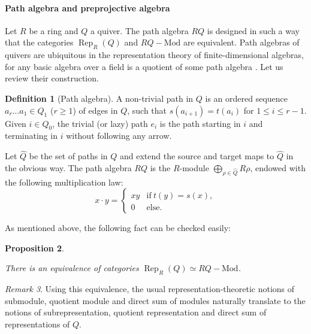 \documentclass[11pt,english]{article}
\numberwithin{equation}{section}
\numberwithin{figure}{section}
\theoremstyle{definition}
\newtheorem{df}{Definition}[subsection]
\theoremstyle{plain}
\newtheorem{prop}[df]{Proposition}
\theoremstyle{remark}
\newtheorem{rmk}[df]{Remark}
\DeclareMathOperator{\Rep}{Rep}
\begin{document}
\paragraph*{Path algebra and preprojective algebra}

Let $R$ be a ring and $Q$ a quiver. The path algebra $RQ$ is designed
in such a way that the categories $\Rep_{R}(Q)$ and $RQ-\mathrm{Mod}$
are equivalent. Path algebras of quivers are ubiquitous in the representation
theory of finite-dimensional algebras, for any basic algebra over
a field is a quotient of some path algebra \cite{ARS97}. Let us review
their construction.

\begin{df}[Path algebra]

A non-trivial path in $Q$ is an ordered sequence $a_{r}\ldots a_{1}\in Q_{1}$
($r\geq1$) of edges in $Q$, such that $s(a_{i+1})=t(a_{i})$ for
$1\leq i\leq r-1$. Given $i\in Q_{0}$, the trivial (or lazy) path
$e_{i}$ is the path starting in $i$ and terminating in $i$ without
following any arrow.

Let $\hat{Q}$ be the set of paths in $Q$ and extend the source and
target maps to $\hat{Q}$ in the obvious way. The path algebra $RQ$
is the $R$-module $\bigoplus_{\rho\in\hat{Q}}R\rho$, endowed with
the following multiplication law:\[
x\cdot y=
\left\{
\begin{array}{ll}
xy & \mathrm{if}\ t(y)=s(x), \\
0 & \mathrm{else.}
\end{array}
\right.
\]

\end{df}

As mentioned above, the following fact can be checked easily:

\begin{prop}{\cite[\S 1]{CB92}} \label{Prop/QuivRepVSModPathAlg}

There is an equivalence of categories $\Rep_{R}(Q)\simeq RQ-\mathrm{Mod}$.

\end{prop}

\begin{rmk}

Using this equivalence, the usual representation-theoretic notions
of submodule, quotient module and direct sum of modules naturally
translate to the notions of subrepresentation, quotient representation
and direct sum of representations of $Q$.

\end{rmk}
\end{document}
